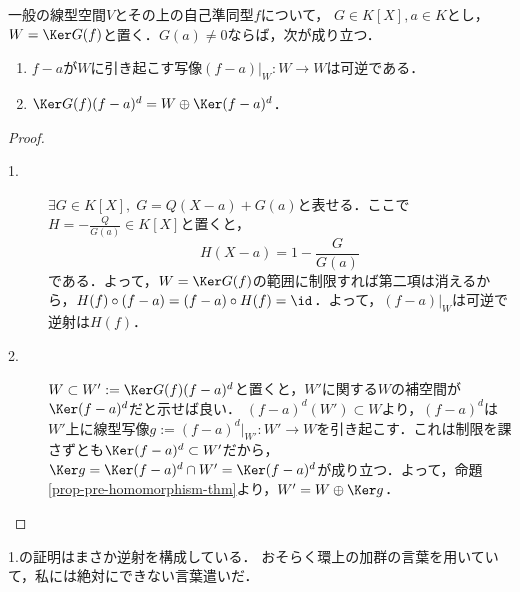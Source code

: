 \documentclass[uplatex, dvipdfmx]{jsreport}
\begin{document}
\begin{lemma}\label{lemma-for-triangulization}
    一般の線型空間$V$とその上の自己準同型$f$について，
    $G\in K[X],a\in K$とし，$W=\Ker G(f)$と置く．$G(a)\ne 0$ならば，次が成り立つ．
    \begin{enumerate}
        \item $f-a$が$W$に引き起こす写像$(f-a)|_W:W\to W$は可逆である．
        \item $\Ker G(f)(f-a)^d=W\oplus\Ker(f-a)^d$．
    \end{enumerate}
\end{lemma}
\begin{proof}\mbox{}
    \begin{description}
        \item[1.] $\exists G\in K[X],\; G=Q(X-a)+G(a)$と表せる．ここで$H=-\frac{Q}{G(a)}\in K[X]$と置くと，
        \[H(X-a)=1-\frac{G}{G(a)}\]
        である．よって，$W=\Ker G(f)$の範囲に制限すれば第二項は消えるから，$H(f)\circ (f-a)=(f-a)\circ H(f)=\id$．よって，$(f-a)|_W$は可逆で逆射は$H(f)$．
        \item[2.] $W\subset W':=\Ker G(f)(f-a)^d$と置くと，$W'$に関する$W$の補空間が$\Ker(f-a)^d$だと示せば良い．
        $(f-a)^d(W')\subset W$より，$(f-a)^d$は$W'$上に線型写像$g:=(f-a)^d|_{W'}:W'\to W$を引き起こす．これは制限を課さずとも$\Ker(f-a)^d\subset W'$だから，$\Ker g=\Ker(f-a)^d\cap W'=\Ker (f-a)^d$が成り立つ．よって，命題\ref{prop-pre-homomorphism-thm}より，$W'=W\oplus\Ker g$．
    \end{description}
\end{proof}
\begin{remark}
    1.の証明はまさか逆射を構成している．
    おそらく環上の加群の言葉を用いていて，私には絶対にできない言葉遣いだ．
\end{remark}
\end{document}
